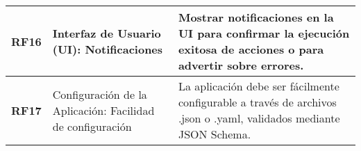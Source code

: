\begin{longtable}{|l|p{5cm}|p{8.5cm}|}
    \textbf{RF16}  & Interfaz de Usuario (UI): Notificaciones                                        & Mostrar notificaciones en la UI para confirmar la ejecución exitosa de acciones o para advertir sobre errores.             \\ \hline
    \textbf{RF17}  & Configuración de la Aplicación: Facilidad de configuración                      & La aplicación debe ser fácilmente configurable a través de archivos .json o .yaml, validados mediante JSON Schema.         \\ \hline
\end{longtable}
